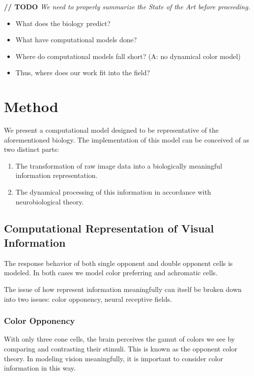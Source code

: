 \documentclass[journal,onecolumn]{IEEEtran}
\begin{document}
\textbf{// TODO} \textit{We need to properly summarize the State of the Art before proceeding.}
\begin{itemize}
    \item What does the biology predict?
    \item What have computational models done?
    \item Where do computational models fall short? (A: no dynamical color model)
    \item Thus, where does our work fit into the field?
\end{itemize}


%
%
%
\section{Method}

We present a computational model designed to be representative of the aforementioned biology. The implementation of this model can be conceived of as two distinct parts:
\begin{enumerate}
    \item The transformation of raw image data into a biologically meaningful information representation.
    \item The dynamical processing of this information in accordance with neurobiological theory.
\end{enumerate}


\subsection*{Computational Representation of Visual Information}

The response behavior of both single opponent and double opponent cells is modeled. In both cases we model color preferring and achromatic cells. 

The issue of how represent information meaningfully can itself be broken down into two issues: color opponency, neural receptive fields.

\subsubsection*{Color Opponency} With only three cone cells, the brain perceives the gamut of colors we see by comparing and contrasting their stimuli. This is known as the opponent color theory. In modeling vision meaningfully, it is important to consider color information in this way.
\end{document}
